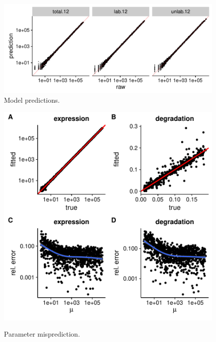 \begin{figure}
 \includegraphics[width=\linewidth]{fig/predictions}
 \caption{Model predictions.}
\end{figure}

\begin{figure}
 \includegraphics[width=\linewidth]{fig/parameters}\\
 \caption{Parameter misprediction.}
\end{figure}